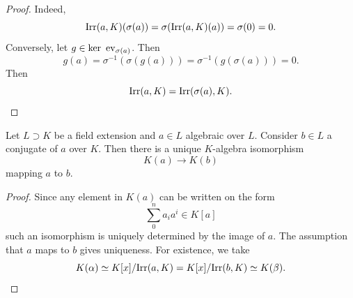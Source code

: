     \begin{proof}
        Indeed, 
        $$
            \mathrm{Irr}(a,K)(\sigma(a)) = \sigma(\mathrm{Irr}(a,K)(a)) = \sigma(0) = 0. 
        $$
        Conversely, let $g\in \ker \ \mathrm{ev}_{\sigma(a)}$. Then 
        $$
            g(a) = \sigma^{-1}(\sigma(g(a))) =\sigma^{-1}(g(\sigma(a))) = 0.  
        $$ 
        Then 
        $$
            \mathrm{Irr}(a,K) = \mathrm{Irr}(\sigma(a),K).
        $$
    \end{proof}
    \begin{lemma}\label{FieldAdjoinedByConjugatesAreUniquelyIsomorphic}
        Let $L\supset K$ be a field extension and $a\in L$ algebraic over $L$. Consider $b\in L$ a conjugate of $a$ over $K$. Then there is a unique $K$-algebra isomorphism
        $$
            K(a) \rightarrow K(b)
        $$
        mapping $a$ to $b$.
    \end{lemma}
    \begin{proof}
        Since any element in $K(a)$ can be written on the form 
        $$
            \sum_0^n a_i a^i \in K[a]
        $$
        such an isomorphism is uniquely determined by the image of $a$. The assumption that $a$ maps to $b$ gives uniqueness. For existence, we take 
        $$
            K(\alpha)\simeq K[x]/\mathrm{Irr}(a,K) = K[x]/\mathrm{Irr}(b,K) \simeq K(\beta). 
        $$
    \end{proof}
